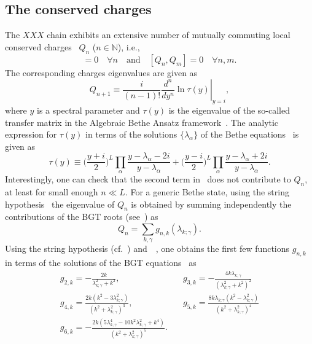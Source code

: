 \documentclass[11pt]{iopart}
\begin{document}
\subsection{The conserved charges}
\label{sec:1.5}

The $XXX$ chain exhibits an extensive number of mutually commuting local conserved 
charges~\cite{grabowski-1995} $Q_n$ ($n\in\mathbb{N}$), i.e., 
%
\begin{equation}
[Q_n,{\mathcal H}]=0\quad\forall n\quad\textrm{and}\quad [Q_n,Q_m]=0\quad\forall n,m.
\end{equation}
%
The corresponding charges eigenvalues are given as 
%
\begin{equation}
\label{Q-def}
\left.Q_{n+1}\equiv\frac{i}{(n-1)!}\frac{d^n}{dy^n}\ln\tau
(y)\right|_{y=i},
\end{equation}
%
where $y$ is a spectral parameter and $\tau(y)$ is the eigenvalue of the so-called 
transfer matrix in the Algebraic Bethe Ansatz framework~\cite{kor-book}. The analytic 
expression for $\tau(y)$ in terms of the solutions $\{\lambda_\alpha\}$ of the Bethe 
equations~ is given as 
%
\begin{equation}
\label{tau}
\tau(y)\equiv\Big(\frac{y+i}{2}\Big)^L\prod\limits_\alpha\frac{y-\lambda_\alpha-2i}
{y-\lambda_\alpha}+\Big(\frac{y-i}{2}\Big)^L\prod\limits_\alpha\frac{y-\lambda_\alpha
+2i}{y-\lambda_\alpha}.
\end{equation}
%
Interestingly, one can check that the second term in~ does not contribute to 
$Q_n$, at least for small enough $n\ll L$. For a generic Bethe state, using the string 
hypothesis~ the eigenvalue of $Q_n$ is obtained by summing 
independently the contributions of the BGT roots (see~) as 
%
\begin{equation}
\label{qngnk}
Q_n=\sum_{k,\gamma}g_{n,k}(\lambda_{k;\gamma}).
\end{equation}
%
Using the string hypothesis (cf.~) and~~, one obtains  
the first few functions $g_{n,k}$ in terms of the solutions of the BGT equations~ 
as 
%
\begin{eqnarray}
\label{gnk}
g_{2,k}=-\frac{2k}{\lambda^2_{k;\gamma}+k^2}, &\quad g_{3,k}=-\frac{4k\lambda_{k;\gamma}}
{(\lambda_{k;\gamma}^2+k^2)^2}\\\nonumber  
g_{4,k}=\frac{2k(k^2-3\lambda_{k;\gamma}^2)}{(k^2+\lambda_{k;\gamma}^2)^3}, &\quad 
g_{5,k}=\frac{8k\lambda_{k;\gamma}(k^2-\lambda_{k;\gamma}^2)}{(k^2+
\lambda_{k;\gamma}^2)^4}\\\nonumber
g_{6,k}=-\frac{2k(5\lambda_{k;\gamma}^4-10k^2\lambda_{k;\gamma}^2+k^4)}{(k^2+
\lambda_{k;\gamma}^2)^5}. 
\end{eqnarray}
\end{document}
